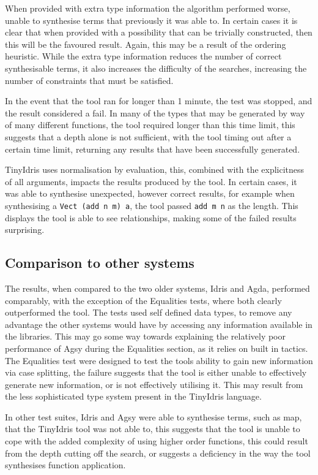 \documentclass[a4paper]{article}
\begin{document}
When provided with extra  type information the algorithm performed
worse, unable to synthesise terms that previously it was able to.
In certain cases it is clear that when provided with a possibility
that can be trivially constructed, then this will be the favoured
result. Again, this may be a result of the ordering heuristic.
While the extra type information reduces the number of correct 
synthesisable terms, it also increases the difficulty of the 
searches, increasing the number of constraints that must be satisfied. 

In the event that the tool ran for longer than 1 minute, the
test was stopped, and the result considered a fail. In many of
the types that may be generated by way of many different
functions, the tool required longer than this time limit, this suggests
that a depth alone is not sufficient, with the tool timing out after
a certain time limit, returning any results that have been successfully
generated. 

TinyIdris uses normalisation by evaluation, this, combined with the
explicitness of all arguments, impacts the results
produced by the tool. In certain cases, it was able to synthesise
unexpected, however correct results, for example when synthesising a
\texttt{Vect (add n m) a}, the tool passed \texttt{add m n} as the
length. This displays the tool is able to see relationships, making
some of the failed results surprising.

\subsection{Comparison to other systems}
\label{sec:orga2f8b7e}
The results, when compared to the two older systems, Idris and Agda, 
performed comparably, with the exception of the Equalities tests,
where both clearly outperformed the tool. The tests used self defined
data types, to remove any advantage the other systems would have by
accessing any information available in the libraries. This may go some
way towards explaining the relatively poor performance of Agsy during
the Equalities section, as it relies on built in tactics.
The Equalities test were designed to test the
tools ability to gain new information via case splitting, the failure
suggests that the tool is either unable to effectively generate new
information, or is not effectively utilising it. This may result from
the less sophisticated type system present in the TinyIdris language.

In other test suites, Idris and Agsy were able to synthesise terms,
such as map, that the TinyIdris tool was not able to, this suggests
that the tool is unable to cope with the added complexity of using
higher order functions, this could result from the depth cutting off
the search, or suggests a deficiency in the way the tool synthesises
function application.
\end{document}
